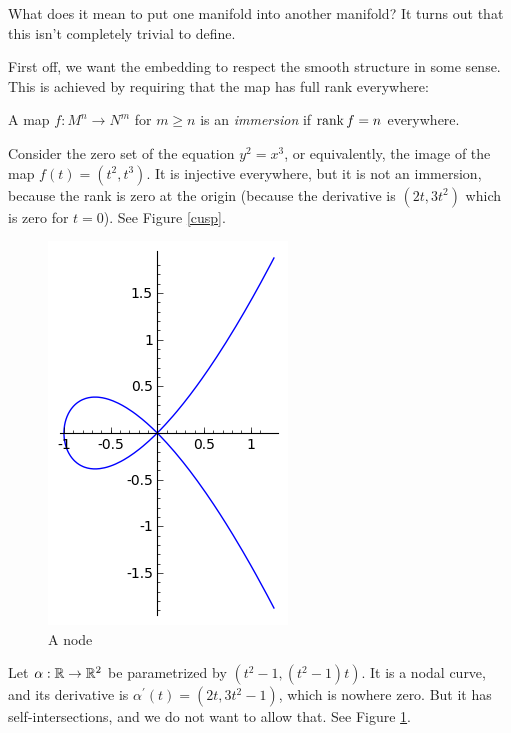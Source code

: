 \documentclass[11pt, english]{article}
\begin{document}
What does it mean to put one manifold into another manifold? It turns out that this isn't completely trivial to define.

First off, we want the embedding to respect the smooth structure in some sense. This is achieved by requiring that the map has full rank everywhere:

\begin{defi}
A map $f:M^n \to N^m$ for $m \geq n$ is an \emph{immersion} if $\operatorname{\mathrm{rank}} f = n$ everywhere.
\end{defi}

\begin{example}
Consider the zero set of the equation $y^2=x^3$, or equivalently, the image of the map $f(t)=(t^2,t^3)$. It is injective everywhere, but it is not an immersion, because the rank is zero at the origin (because the derivative is $(2t,3t^2)$ which is zero for $t=0$). See Figure \ref{cusp}.
\end{example}


\begin{figure}[th]
\centering
\includegraphics{node}
\caption{A node}
\label{node}
\end{figure}

\begin{example}
Let $\alpha:\mathbb{R} \to \mathbb{R}^2$ be parametrized by $\left(t^2-1,(t^2-1)t\right)$. It is a nodal curve, and its derivative is $\alpha^\prime(t) = \left(2t,3t^2-1\right)$, which is nowhere zero. But it has self-intersections, and we do not want to allow that. See Figure \ref{node}.
\end{example}
\end{document}
